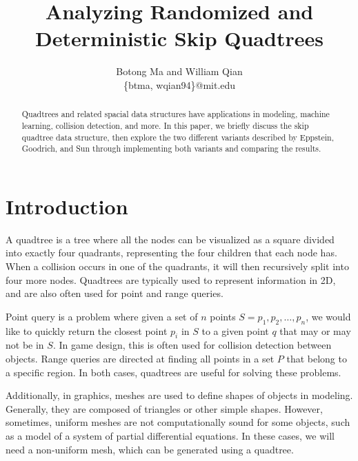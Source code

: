 \documentclass[12pt]{article}
\begin{document}
    \title{Analyzing Randomized and Deterministic Skip Quadtrees}
    \author{Botong Ma and William Qian\\\{btma, wqian94\}@mit.edu}
    \date{} %
    
    \maketitle
    
    \begin{abstract}
        \noindent Quadtrees and related spacial data structures have applications in modeling, machine learning, collision detection, and more. In this paper, we briefly discuss the skip quadtree data structure, then explore the two different variants described by Eppstein, Goodrich, and Sun \cite{sqt} through implementing both variants and comparing the results.
        
    \end{abstract}
    
    \section{Introduction} 
        \indent A quadtree is a tree where all the nodes can be visualized as a square divided into exactly four quadrants, representing the four children that each node has. When a collision occurs in one of the quadrants, it will then recursively split into four more nodes. Quadtrees are typically used to represent information in 2D, and are also often used for point and range queries. 
        
        Point query is a problem where given a set of $n$ points $S = {p_1, p_2, \hdots, p_n}$, we would like to quickly return the closest point $p_i$ in $S$ to a given point $q$ that may or may not be in $S$. In game design, this is often used for collision detection between objects. Range queries are directed at finding all points in a set $P$ that belong to a specific region. In both cases, quadtrees are useful for solving these problems. 
        
        Additionally, in graphics, meshes are used to define shapes of objects in modeling. Generally, they are composed of triangles or other simple shapes. However, sometimes, uniform meshes are not computationally sound for some objects, such as a model of a system of partial differential equations. In these cases, we will need a non-uniform mesh, which can be generated using a quadtree.
        
\end{document}
